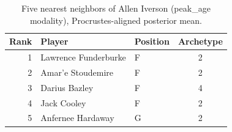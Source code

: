 \begin{table}[htbp]
  \centering\small
  \begin{tabular}{rllc}
    \toprule
    Rank & Player & Position & Archetype \\
    \midrule
    1 & Lawrence Funderburke & F & 2 \\
    2 & Amar'e Stoudemire & F & 2 \\
    3 & Darius Bazley & F & 4 \\
    4 & Jack Cooley & F & 2 \\
    5 & Anfernee Hardaway & G & 2 \\
    \bottomrule
  \end{tabular}
  \caption{Five nearest neighbors of Allen Iverson (peak_age modality), Procrustes-aligned posterior mean.}
  \label{tab:Allen_Iverson_neighbors_peak_age}
\end{table}

